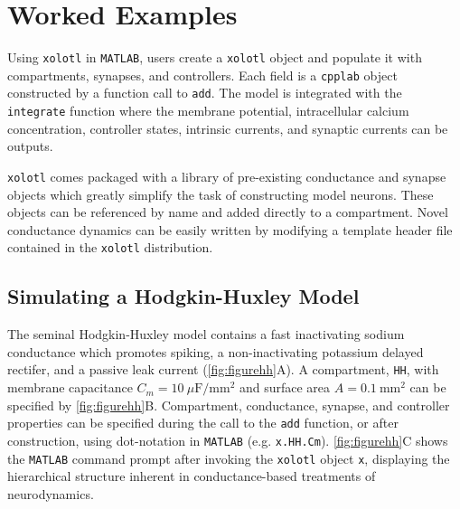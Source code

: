 \documentclass{frontiersSCNS} %
\begin{document}
%
%
%
%
%
%

\section{Worked Examples}
\label{sec:examples}

Using \texttt{xolotl} in \texttt{MATLAB}, users create a \texttt{xolotl} object and populate it with compartments, synapses, and controllers. Each field is a \texttt{cpplab} object constructed by a function call to \texttt{add}. The model is integrated with the \texttt{integrate} function where the membrane potential, intracellular calcium concentration, controller states, intrinsic currents, and synaptic currents can be outputs.

\texttt{xolotl} comes packaged with a library of pre-existing conductance and synapse objects which greatly simplify the task of constructing model neurons. These objects can be referenced by name and added directly to a compartment. Novel conductance dynamics can be easily written by modifying a template header file contained in the \texttt{xolotl} distribution. 

%
%
%
%
%
%

\subsection{Simulating a Hodgkin-Huxley Model}

The seminal Hodgkin-Huxley model \autocite{hodgkinComponentsMembraneConductance1952, hodgkinMeasurementCurrentvoltageRelations1952} contains a fast inactivating sodium conductance which promotes spiking, a non-inactivating potassium delayed rectifer, and a passive leak current (\ref{fig:figurehh}A). A compartment, \texttt{HH}, with membrane capacitance $C_m = 10 ~ \mu\mathrm{F/mm^2}$ and surface area $A = 0.1 ~ \mathrm{mm^2}$ can be specified by \ref{fig:figurehh}B. Compartment, conductance, synapse, and controller properties can be specified during the call to the \texttt{add} function, or after construction, using dot-notation in \texttt{MATLAB} (e.g. \texttt{x.HH.Cm}). \ref{fig:figurehh}C shows the \texttt{MATLAB} command prompt after invoking the \texttt{xolotl} object \texttt{x}, displaying the hierarchical structure inherent in conductance-based treatments of neurodynamics.
\end{document}

